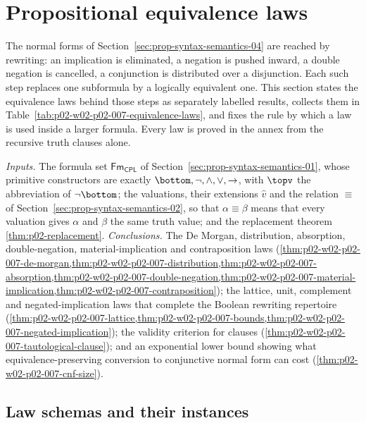 \section{Propositional equivalence laws}
\label{sec:p02-w02-p02-007-equivalence-laws}

The normal forms of Section~\ref{sec:prop-syntax-semantics-04} are reached by
rewriting: an implication is eliminated, a negation is pushed inward, a
double negation is cancelled, a conjunction is distributed over a
disjunction.  Each such step replaces one subformula by a logically
equivalent one.  This section states the equivalence laws behind those steps
as separately labelled results, collects them in
Table~\ref{tab:p02-w02-p02-007-equivalence-laws}, and fixes the rule by which
a law is used inside a larger formula.  Every law is proved in the annex from
the recursive truth clauses alone.

\emph{Inputs.} The formula set \(\mathsf{Fm}_{\mathsf{CPL}}\) of
Section~\ref{sec:prop-syntax-semantics-01}, whose primitive constructors are
exactly \(\bottom,\neg,\land,\lor,\to\), with \(\topv\) the abbreviation of
\(\neg\bottom\); the valuations, their extensions \(\widehat v\) and the
relation \(\equiv\) of Section~\ref{sec:prop-syntax-semantics-02}, so that
\(\alpha\equiv\beta\) means that every valuation gives \(\alpha\) and
\(\beta\) the same truth value; and the replacement theorem
\cref{thm:p02-replacement}.
\emph{Conclusions.} The De Morgan, distribution, absorption, double-negation,
material-implication and contraposition laws
(\cref{thm:p02-w02-p02-007-de-morgan,thm:p02-w02-p02-007-distribution,thm:p02-w02-p02-007-absorption,thm:p02-w02-p02-007-double-negation,thm:p02-w02-p02-007-material-implication,thm:p02-w02-p02-007-contraposition});
the lattice, unit, complement and negated-implication laws that complete the
Boolean rewriting repertoire
(\cref{thm:p02-w02-p02-007-lattice,thm:p02-w02-p02-007-bounds,thm:p02-w02-p02-007-negated-implication});
the validity criterion for clauses (\cref{thm:p02-w02-p02-007-tautological-clause});
and an exponential lower bound showing what equivalence-preserving
conversion to conjunctive normal form can cost
(\cref{thm:p02-w02-p02-007-cnf-size}).

\subsection{Law schemas and their instances}
\label{sec:p02-w02-p02-007-schemas}

